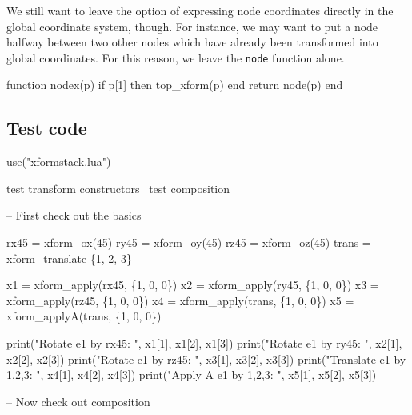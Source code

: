 We still want to leave the option of expressing node coordinates
directly in the global coordinate system, though.  For instance,
we may want to put a node halfway between two other nodes which
have already been transformed into global coordinates.  For this
reason, we leave the {\tt{}node} function alone.

\nwenddocs{}\plusendmoddef
function nodex(p)
  if p[1] then
    top_xform(p)
  end
  return node(p)
end

\nwendcode{}\nwdocspar



\subsection{Test code}

\nwenddocs{}\endmoddef
use("xformstack.lua")

\LA{}test transform constructors~{\nwtagstyle{}}\RA{}
\LA{}test composition~{\nwtagstyle{}}\RA{}
\nwendcode{}\nwdocspar

\nwenddocs{}\endmoddef
-- First check out the basics

rx45 = xform_ox(45)
ry45 = xform_oy(45)
rz45 = xform_oz(45)
trans = xform_translate \{1, 2, 3\}

x1 = xform_apply(rx45,  \{1, 0, 0\})
x2 = xform_apply(ry45,  \{1, 0, 0\})
x3 = xform_apply(rz45,  \{1, 0, 0\})
x4 = xform_apply(trans, \{1, 0, 0\})
x5 = xform_applyA(trans, \{1, 0, 0\})

print("Rotate e1 by rx45: ",     x1[1], x1[2], x1[3])
print("Rotate e1 by ry45: ",     x2[1], x2[2], x2[3])
print("Rotate e1 by rz45: ",     x3[1], x3[2], x3[3])
print("Translate e1 by 1,2,3: ", x4[1], x4[2], x4[3])
print("Apply A e1 by 1,2,3: ",   x5[1], x5[2], x5[3])

\nwendcode{}\nwdocspar

\nwenddocs{}\endmoddef
-- Now check out composition

